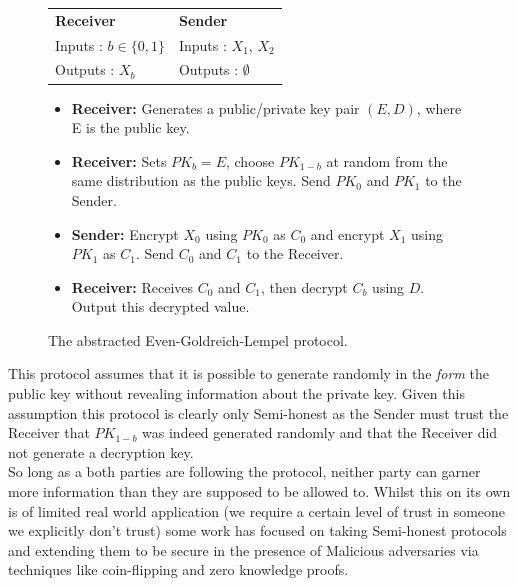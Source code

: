 \documentclass[a4paper,10pt]{article}
\begin{document}
				\begin{figure}[!htb]
					\begin{tabular}[!htb]{p{6cm} p{6cm}}
						\textbf{Receiver} & \textbf{Sender}\\
						Inputs : $b \in \{0, 1\}$ & Inputs : $X_1$, $X_2$\\
						Outputs : $X_b$ & Outputs : $\emptyset$\\
					\end{tabular}

					\begin{itemize}
						\setlength{\itemsep}{0.5pt}
						\setlength{\parskip}{0pt}
						\setlength{\parsep}{0pt}

						\item \textbf{Receiver:} Generates a public/private key pair $(E, D)$, where E is the public key.\\
						\item \textbf{Receiver:} Sets $PK_b = E$, choose $PK_{1-b}$ at random from the same distribution as the public keys. Send $PK_0$ and $PK_1$ to the Sender.\\
						\item \textbf{Sender:} Encrypt $X_0$ using $PK_0$ as $C_0$ and encrypt $X_1$ using $PK_1$ as $C_1$. Send $C_0$ and $C_1$ to the Receiver.\\
						\item \textbf{Receiver:} Receives $C_0$ and $C_1$, then decrypt $C_b$ using $D$. Output this decrypted value.
					\end{itemize}

					\caption{The abstracted Even-Goldreich-Lempel protocol. \label{fig:EvenGoldreichLempel}}
				\end{figure}

				This protocol assumes that it is possible to generate randomly in the \emph{form} the public key without revealing information about the private key. Given this assumption this protocol is clearly only Semi-honest as the Sender must trust the Receiver that $PK_{1-b}$ was indeed generated randomly and that the Receiver did not generate a decryption key.\\

				So long as a both parties are following the protocol, neither party can garner more information than they are supposed to be allowed to. Whilst this on its own is of limited real world application (we require a certain level of trust in someone we explicitly don't trust) some work has focused on taking Semi-honest protocols and extending them to be secure in the presence of Malicious adversaries via techniques like coin-flipping and zero knowledge proofs.
 
\end{document}
